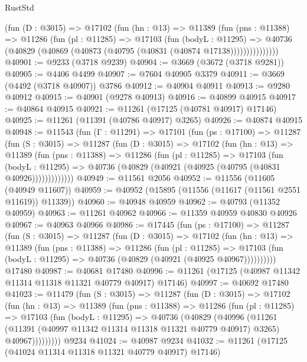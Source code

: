\begin{lexlean}{RustStd}
\begin{coremodule}
            (fun (D : @3015) =>
            @17102
              (fun (hn : @13) =>
              @11389
                (fun (pns : @11388) =>
                @11286
                  (fun (pl : @11285) =>
                  @17103
                    (fun (bodyL : @11295) =>
                    @40736 (@40829 (@40869 (@40873 (@40795 (@40831 (@40874 @17138)))))))))))))))
@40901 := @9233 (@3718 @9239)
@40904 := @3669 (@3672 (@3718 @9281))
@40905 := @4406 @4499
@40907 := @7604 @40905 @3379
@40911 := @3669 (@4492 (@3718 @40907)) @3786
@40912 := @40904 @40911
@40913 := @9280 @40912
@40915 := @40901 (@9278 @40913)
@40916 := @40899 @40915
@40917 := @40864 @40915
@40921 := @11261 (@17125 (@40781 @40917) @17146)
@40925 := @11261 (@11391 (@40786 @40917) @3265)
@40926 := @40874 @40915
@40948 := @11543
    (fun (Γ : @11291) =>
    @17101
      (fun (ps : @17100) =>
      @11287
        (fun (S : @3015) =>
        @11287
          (fun (D : @3015) =>
          @17102
            (fun (hn : @13) =>
            @11389
              (fun (pns : @11388) =>
              @11286
                (fun (pl : @11285) =>
                @17103
                  (fun (bodyL : @11295) =>
                  @40736 (@40829 (@40921 (@40925 (@40795 (@40831 @40926)))))))))))))
@40949 := @11561 @2056
@40952 := @11556 (@11605 (@40949 @11607))
@40959 := @40952 (@15895 (@11556 (@11617 (@11561 @2551 @11619)) @11339))
@40960 := @40948 @40959
@40962 := @40793 (@11352 @40959)
@40963 := @11261 @40962
@40966 := @11359 @40959 @40830 @40926
@40967 := @40963 @40966
@40986 := @17445
    (fun (ps : @17100) =>
    @11287
      (fun (S : @3015) =>
      @11287
        (fun (D : @3015) =>
        @17102
          (fun (hn : @13) =>
          @11389
            (fun (pns : @11388) =>
            @11286
              (fun (pl : @11285) =>
              @17103 (fun (bodyL : @11295) => @40736 (@40829 (@40921 (@40925 @40967))))))))))
    @17480
@40987 := @40681 @17480
@40996 := @11261 (@17125 (@40987 @11342 @11314 @11318 @11321 @40779 @40917) @17146)
@40997 := @40692 @17480
@41023 := @11479
    (fun (S : @3015) =>
    @11287
      (fun (D : @3015) =>
      @17102
        (fun (hn : @13) =>
        @11389
          (fun (pns : @11388) =>
          @11286
            (fun (pl : @11285) =>
            @17103
              (fun (bodyL : @11295) =>
              @40736
                (@40829
                  (@40996
                    (@11261
                      (@11391 (@40997 @11342 @11314 @11318 @11321 @40779 @40917) @3265)
                      @40967)))))))))
    @9234
@41024 := @40987 @9234
@41032 := @11261 (@17125 (@41024 @11314 @11318 @11321 @40779 @40917) @17146)

\end{coremodule}
\end{lexlean}
